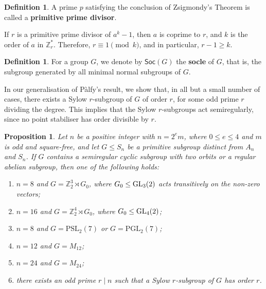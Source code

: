 \documentclass[11pt]{amsart}
\numberwithin{equation}{section}
\newtheorem{prop}[thrm]{Proposition}
\theoremstyle{definition}
\newtheorem{defin}[thrm]{Definition}
\newcounter{case}
\def\GL{{\rm GL}}
\def\Z{{\mathbb Z}}
\def\soc{{\mathsf{Soc}}}
\begin{document}
	\begin{defin}
		A prime $p$ satisfying the conclusion of Zsigmondy’s Theorem is called a \textbf{primitive prime divisor}.
	\end{defin}
	If $r$ is a primitive prime divisor of $a^k - 1$, then $a$ is coprime to $r$, and $k$ is the order of $a$ in $\Z_r^*$. 
	Therefore, $r \equiv 1 \pmod{k}$, and in particular, $r - 1 \ge k$.
	
	\begin{defin}
		For a group $G$, we denote by $\soc(G)$ the \textbf{socle} of $G$, that is, the subgroup generated by all minimal normal subgroups of $G$.
	\end{defin}
	
	In our generalisation of P\`alfy’s result, we show that, in all but a small number of cases, there exists a Sylow $r$-subgroup of $G$ of order $r$, for some odd prime $r$ dividing the degree. 
	This implies that the Sylow $r$-subgroups act semiregularly, since  no point stabiliser has order divisible by $r$.
	
	\begin{prop}\label{090921a} 
		Let $n$ be a positive integer with $n = 2^e m$, where $0 \le e \le 4$ and $m$ is odd and square-free, and let $G \leq S_n$ be a primitive subgroup distinct from $A_n$ and $S_n$. 
		If $G$ contains a semiregular cyclic subgroup with two orbits or a regular abelian subgroup, then one of the following holds:
		\begin{enumerate}
			\item\label{pablo1} $n = 8$ and $G = \Z_2^3 \rtimes G_0$, where $G_0 \leq \GL_3(2)$ acts transitively on the non-zero vectors;
			\item\label{pablo2} $n = 16$ and $G = \Z_2^4 \rtimes G_0$, where $G_0 \leq \GL_4(2)$;
			\item\label{pablo22}$n=8$ and $G=\mathrm{PSL}_2(7)$ or $G=\mathrm{PGL}_2(7)$;
			\item\label{pablo3} $n = 12$ and $G = M_{12}$;
			\item\label{pablo4} $n = 24$ and $G = M_{24}$;
			\item\label{pablo5} there exists an odd prime $r \mid n$ such that a Sylow $r$-subgroup of $G$ has order $r$.
		\end{enumerate}
	\end{prop}
	
\end{document}
